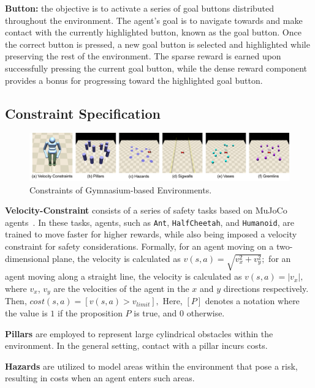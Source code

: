 \documentclass{article}
\begin{document}
\textbf{Button:} the objective is to activate a series of goal buttons distributed throughout the environment. The agent's goal is to navigate towards and make contact with the currently highlighted button, known as the goal button. Once the correct button is pressed, a new goal button is selected and highlighted while preserving the rest of the environment. The sparse reward is earned upon successfully pressing the current goal button, while the dense reward component provides a bonus for progressing toward the highlighted goal button. 



\subsection{Constraint Specification}
\begin{figure}[H]
  \centering
  \includegraphics[width=\linewidth]{assets/main-paper/gym-constraints.pdf}
  \caption{Constraints of Gymnasium-based Environments.}
\end{figure}

\textbf{Velocity-Constraint} consists of a series of safety tasks based on MuJoCo agents~\cite{todorov2012mujoco}. In these tasks, agents, such as \texttt{Ant}, \texttt{HalfCheetah}, and \texttt{Humanoid}, are trained to move faster for higher rewards, while also being imposed a velocity constraint for safety considerations. Formally, for an agent moving on a two-dimensional plane, the velocity is calculated as 
$
v(s,a)=\sqrt{v^2_x+v^2_y};
$
for an agent moving along a straight line, the velocity is calculated as $
v(s,a)=|v_x|,
$
where $v_x$, $v_y$ are the velocities of the agent in the $x$ and $y$ directions respectively.
Then, 
$cost(s,a) = [v(s,a) > v_{limit}],$
Here, $[P]$ denotes a notation where the value is $1$ if the proposition $P$ is true, and $0$ otherwise.


\textbf{Pillars} are employed to represent large cylindrical obstacles within the environment. In the general setting, contact with a pillar incurs costs.

\textbf{Hazards} are utilized to model areas within the environment that pose a risk, resulting in costs when an agent enters such areas.
\end{document}

